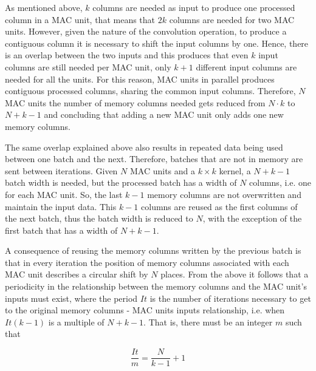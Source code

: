 \documentclass[conference,compsoc]{IEEEtran}
\begin{document}
As mentioned above, $k$ columns are needed as input to produce one processed
column in a MAC unit, that means that $2k$ columns are needed for two MAC units.
However, given the nature of the convolution operation, to produce a contiguous
column it is necessary to shift the input columns by one. Hence, there is an
overlap between the two inputs and this produces that even $k$ input columns are
still needed per MAC unit, only $k+1$ different input columns are needed for all
the units. For this reason, MAC units in parallel produces contiguous processed
columns, sharing the common input columns. Therefore, $N$ MAC units the number
of memory columns needed gets reduced from $N\cdot k$ to $N+k-1$ and concluding
that adding a new MAC unit only adds one new memory columns.

The same overlap explained above also results in repeated data being used
between one batch and the next. Therefore, batches that are not in memory are
sent between iterations. Given $N$ MAC units and a $k\times k$ kernel, a $N+k-1$
batch width is needed, but the processed batch has a width of $N$ columns, i.e.
one for each MAC unit. So, the last $k-1$ memory columns are not overwritten and
maintain the input data. This $k-1$ columns are reused as the first columns
of the next batch, thus the batch width is reduced to $N$, with the exception of
the first batch that has a width of $N+k-1$.

A consequence of reusing the memory columns written by the previous batch is
that in every iteration the position of memory columns associated with each
MAC unit describes a circular shift by $N$ places. From the above it
follows that a periodicity in the relationship between the memory columns and the
MAC unit's inputs must exist, where the period $It$ is the number of
iterations necessary to get to the original memory columns - MAC units
inputs relationship, i.e. when $It(k-1)$ is a multiple of $N+k-1$. That is, there
must be an integer $m$ such that 

\begin{equation}\label{niter}
  \frac{It}{m} = \frac{N}{k-1} + 1
\end{equation}
\end{document}
